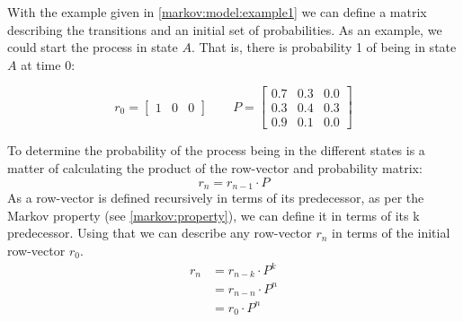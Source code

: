 With the example given in \cref{markov:model:example1} we can define a matrix describing the transitions and an initial set of probabilities.
As an example, we could start the process in state $A$.
That is, there is probability 1 of being in state $A$ at time 0:

\begin{equation}\label{markov:model:example1:initial}
r_0 = \begin{bmatrix} 1 & 0 & 0 \end{bmatrix}
\quad\quad
P = \begin{bmatrix}
       0.7 & 0.3 & 0.0 \\[0.3em]
       0.3 & 0.4 & 0.3 \\[0.3em]
       0.9 & 0.1 & 0.0
     \end{bmatrix}
\end{equation}

To determine the probability of the process being in the different states is a matter of calculating the product of the row-vector and probability matrix:
$$r_n = r_{n-1} \cdot P$$
As a row-vector is defined recursively in terms of its predecessor, as per the Markov property (see \cref{markov:property}), we can define it in terms of its k predecessor.
Using that we can describe any row-vector $r_n$ in terms of the initial row-vector $r_0$.
\begin{align}
r_n &= r_{n-k} \cdot P^k\\
    &= r_{n - n} \cdot P^n\nonumber\\
    &= r_0 \cdot P^n\nonumber
\end{align}
